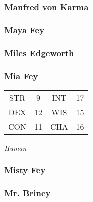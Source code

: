 \subsubsection{Manfred von Karma}
\label{people:mvonkarma}

\subsubsection{Maya Fey}
\label{people:mayafey}

\subsubsection{Miles Edgeworth}
\label{people:miles}

\subsubsection{Mia Fey}
\label{people:miafey}
\begin{center}
\begin{tabular}{c c|c c}
STR & 9 & INT & 17\\
DEX & 12 & WIS & 15 \\
CON & 11 & CHA & 16 \end{tabular}\end{center}
\textit{Human}\\



\subsubsection{Misty Fey}
\label{people:mistyfey}

\subsubsection{Mr. Briney}
\label{people:briney}

